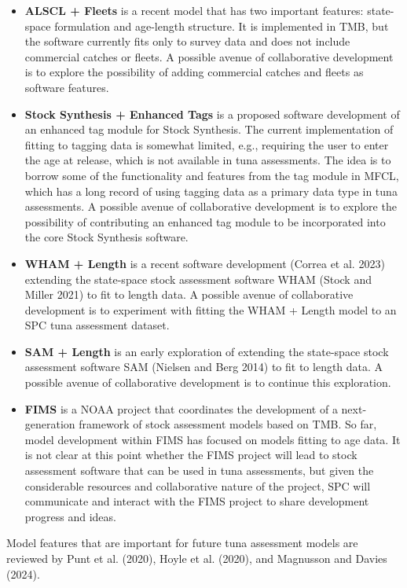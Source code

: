 \documentclass{SCreport}
\begin{document}
\begin{itemize}
  \item \textbf{ALSCL + Fleets} is a recent model that has two important
  features: state-space formulation and age-length structure. It is implemented
  in TMB, but the software currently fits only to survey data and does not
  include commercial catches or fleets. A possible avenue of collaborative
  development is to explore the possibility of adding commercial catches and
  fleets as software features.
  \newpage
  \item \textbf{Stock Synthesis + Enhanced Tags} is a proposed software
  development of an enhanced tag module for Stock Synthesis. The current
  implementation of fitting to tagging data is somewhat limited, e.g., requiring
  the user to enter the age at release, which is not available in tuna
  assessments. The idea is to borrow some of the functionality and features from
  the tag module in MFCL, which has a long record of using tagging data as a
  primary data type in tuna assessments. A possible avenue of collaborative
  development is to explore the possibility of contributing an enhanced tag
  module to be incorporated into the core Stock Synthesis software.
  \item \textbf{WHAM + Length} is a recent software development (Correa et al.
  2023) extending the state-space stock assessment software WHAM (Stock and
  Miller 2021) to fit to length data. A possible avenue of collaborative
  development is to experiment with fitting the WHAM + Length model to an SPC
  tuna assessment dataset.
  \item \textbf{SAM + Length} is an early exploration of extending the
  state-space stock assessment software SAM (Nielsen and Berg 2014) to fit to
  length data. A possible avenue of collaborative development is to continue
  this exploration.
  \item \textbf{FIMS} is a NOAA project that coordinates the development of a
  next-generation framework of stock assessment models based on TMB. So far,
  model development within FIMS has focused on models fitting to age data. It is
  not clear at this point whether the FIMS project will lead to stock assessment
  software that can be used in tuna assessments, but given the considerable
  resources and collaborative nature of the project, SPC will communicate and
  interact with the FIMS project to share development progress and ideas.
\end{itemize}

Model features that are important for future tuna assessment models are reviewed
by Punt et al. (2020), Hoyle et al. (2020), and Magnusson and Davies (2024).
\end{document}
